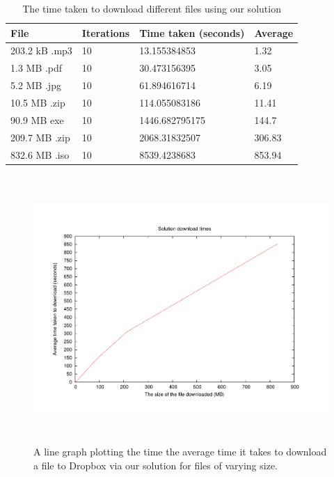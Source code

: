 \documentclass[12pt, titlepage]{article}
\begin{document}
\bigskip
\begin{table}[H]
\begin{center}
    \begin{tabular}{ | l | l | l | l |}
    \hline
    \textbf{File} & \textbf{Iterations} & \textbf{Time taken (seconds)} & \textbf{Average} \\ \hline
    203.2 kB .mp3 & 10 & 13.155384853 & 1.32 \\ \hline
    1.3 MB .pdf  & 10 & 30.473156395 & 3.05 \\ \hline
    5.2 MB .jpg & 10 & 61.894616714 & 6.19 \\ \hline
    10.5 MB .zip & 10 & 114.055083186 & 11.41 \\ \hline
    90.9 MB exe & 10 & 1446.682795175  & 144.7 \\ \hline
    209.7 MB .zip & 10 & 2068.31832507 & 306.83 \\ \hline
    832.6 MB .iso & 10 & 8539.4238683 & 853.94 \\ \hline
    \end{tabular}
    \caption{The time taken to download different files using our solution} \label{tab:downloadBenchmark}
    \end{center}
    \end{table}
\bigskip

\begin{figure}[H]
\centerline{\includegraphics[height=4.0in,width=7in,angle=0]{plots/solutionDownload/solutionDownloadTimes.pdf}}
\caption{A line graph plotting the time the average time it takes to download a file to Dropbox via our solution for files of varying size.}
\label{fig:solutionDownloadLineGraph}
\end{figure}
\end{document}
